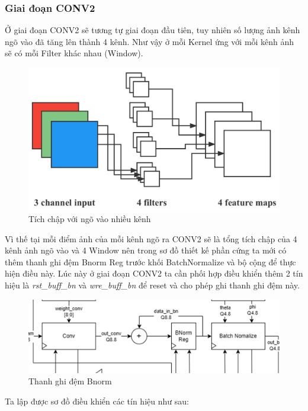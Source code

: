 \subsubsection{Giai đoạn CONV2}
Ở giai đoạn CONV2 sẽ tương tự giai đoạn đầu tiên, tuy nhiên số lượng ảnh kênh ngõ vào đã tăng lên thành 4 kênh. Như vậy ở mỗi Kernel ứng với mỗi kênh ảnh sẽ có mỗi Filter khác nhau (Window). 
\begin{figure}[H]
    \centering
    \includegraphics[width=0.75\linewidth]{Images/drones-06-00152-g010.png}
    \caption{Tích chập với ngõ vào nhiều kênh}
    \label{fig:enter-label}
\end{figure}
Vì thế tại mỗi điểm ảnh của mỗi kênh ngõ ra CONV2 sẽ là tổng tích chập của 4 kênh ảnh ngõ vào và 4 Window nên trong sơ đồ thiết kế phần cứng ta mới có thêm thanh ghi đệm Bnorm Reg trước khối BatchNormalize và bộ cộng để thực hiện điều này. Lúc này ở giai đoạn CONV2 ta cần phối hợp điều khiển thêm 2 tín hiệu là \textit{rst\_buff\_bn} và \textit{wre\_buff\_bn} để reset và cho phép ghi thanh ghi đệm này.
\begin{figure}[H]
    \centering
    \includegraphics[width=0.75\linewidth]{Images/buffbn.png}
    \caption{Thanh ghi đệm Bnorm}
    \label{fig:enter-label}
\end{figure}
Ta lập được sơ đồ điều khiển các tín hiệu như sau:

